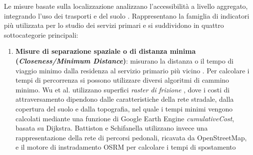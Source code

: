 Le misure basate sulla localizzazione analizzano l'accessibilità a livello aggregato, integrando l'uso dei trasporti e del suolo \cite{geurs2004, mazzulla2024}. Rappresentano la famiglia di indicatori più utilizzata per lo studio dei servizi primari e si suddividono in quattro sottocategorie principali:
\begin{enumerate}
    \item \textbf{Misure di separazione spaziale o di distanza minima (\textit{Closeness/Minimum Distance})}:  misurano la distanza o il tempo di viaggio minimo dalla residenza al servizio primario più vicino \cite{battiston2024,wu2025,benassai2026}.
    Per calcolare i tempi di percorrenza si possono utilizzare diversi algoritmi di cammino minimo. 
    Wu et al. utilizzano superfici \textit{raster di frizione} , dove i costi di attraversamento dipendono dalle caratteristiche della rete stradale, dalla copertura del suolo e dalla topografia, nel quale i tempi minimi vengono calcolati mediante una funzione di Google Earth Engine \textit{cumulativeCost}, basata su Dijkstra.\cite{wu2025}
    Battiston e Schifanella utilizzano invece una rappresentazione della rete di percorsi pedonali, ricavata da OpenStreetMap, e il motore di instradamento OSRM per calcolare i tempi di spostamento \cite{battiston2024}
    

\end{enumerate}
